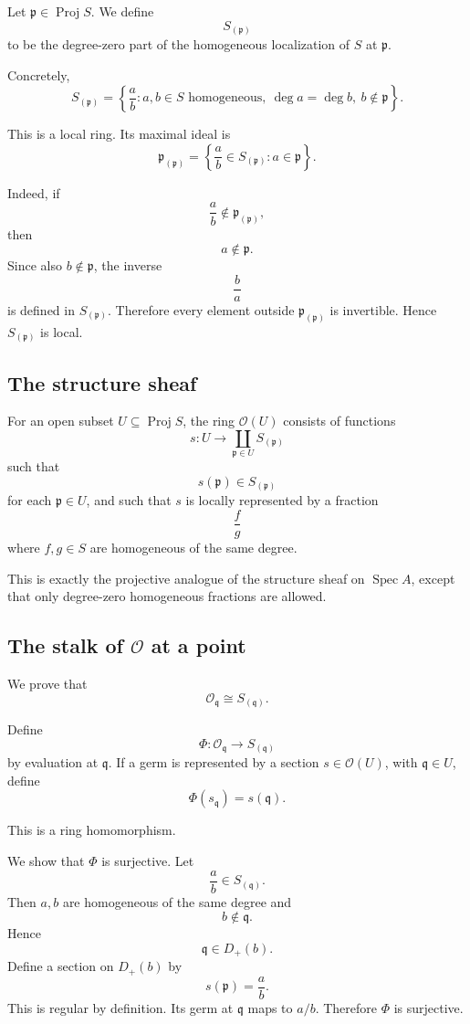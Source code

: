 Let \(\mathfrak p\in \operatorname{Proj} S\). We define
\[
S_{(\mathfrak p)}
\]
to be the degree-zero part of the homogeneous localization of \(S\) at
\(\mathfrak p\).

Concretely,
\[
S_{(\mathfrak p)}
=
\left\{
\frac{a}{b} :
a,b\in S \text{ homogeneous},\ \deg a=\deg b,\ b\notin \mathfrak p
\right\}.
\]

This is a local ring. Its maximal ideal is
\[
\mathfrak p_{(\mathfrak p)}
=
\left\{
\frac{a}{b}\in S_{(\mathfrak p)} : a\in \mathfrak p
\right\}.
\]

Indeed, if
\[
\frac{a}{b}\notin \mathfrak p_{(\mathfrak p)},
\]
then
\[
a\notin \mathfrak p.
\]
Since also \(b\notin \mathfrak p\), the inverse
\[
\frac{b}{a}
\]
is defined in \(S_{(\mathfrak p)}\). Therefore every element outside
\(\mathfrak p_{(\mathfrak p)}\) is invertible. Hence \(S_{(\mathfrak p)}\) is local.

\subsection{The structure sheaf}

For an open subset \(U\subseteq \operatorname{Proj} S\), the ring \(\mathcal O(U)\) consists of
functions
\[
s:U\longrightarrow \coprod_{\mathfrak p\in U}S_{(\mathfrak p)}
\]
such that
\[
s(\mathfrak p)\in S_{(\mathfrak p)}
\]
for each \(\mathfrak p\in U\), and such that \(s\) is locally represented by a fraction
\[
\frac{f}{g}
\]
where \(f,g\in S\) are homogeneous of the same degree.

This is exactly the projective analogue of the structure sheaf on \(\operatorname{Spec} A\), except
that only degree-zero homogeneous fractions are allowed.

\subsection{The stalk of \texorpdfstring{$\mathcal O$}{O} at a point}

We prove that
\[
\mathcal O_{\mathfrak q}\cong S_{(\mathfrak q)}.
\]

Define
\[
\Phi:\mathcal O_{\mathfrak q}\longrightarrow S_{(\mathfrak q)}
\]
by evaluation at \(\mathfrak q\). If a germ is represented by a section \(s\in\mathcal O(U)\),
with \(\mathfrak q\in U\), define
\[
\Phi(s_{\mathfrak q})=s(\mathfrak q).
\]

This is a ring homomorphism.

We show that \(\Phi\) is surjective. Let
\[
\frac{a}{b}\in S_{(\mathfrak q)}.
\]
Then \(a,b\) are homogeneous of the same degree and
\[
b\notin \mathfrak q.
\]
Hence
\[
\mathfrak q\in D_+(b).
\]
Define a section on \(D_+(b)\) by
\[
s(\mathfrak p)=\frac{a}{b}.
\]
This is regular by definition. Its germ at \(\mathfrak q\) maps to \(a/b\). Therefore
\(\Phi\) is surjective.

